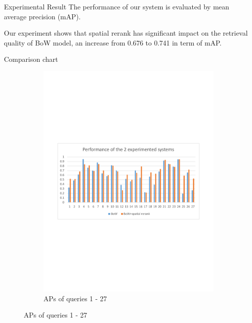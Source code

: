 \begin{frame}{Experimental Result}
  The performance of our system is evaluated by \alert{mean average precision} (mAP).

  Our experiment shows that spatial rerank has significant impact on the retrieval quality of BoW model, an increase from 0.676 to 0.741 in term of mAP.
\end{frame}

\begin{frame}{Comparison chart}
  \begin{figure}
    \begin{figure}{}
        \centering
        \includegraphics[width=4.0in]{ap1.pdf}
        \caption{APs of queries 1 - 27}
    \end{figure}
  \end{figure}
\end{frame}

